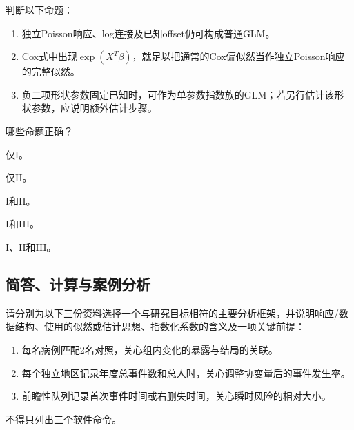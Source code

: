 \par\noindent\begin{minipage}{\linewidth}
判断以下命题：
\begin{enumerate}[label=\Roman*.]
\item 独立Poisson响应、log连接及已知offset仍可构成普通GLM。
\item Cox式中出现$\exp(X^T\beta)$，就足以把通常的Cox偏似然当作独立Poisson响应的完整似然。
\item 负二项形状参数固定已知时，可作为单参数指数族的GLM；若另行估计该形状参数，应说明额外估计步骤。
\end{enumerate}
哪些命题正确？
\begin{choices}
\item 仅I。
\item 仅II。
\item I和II。
\item I和III。
\item I、II和III。
\end{choices}
\end{minipage}\par\medskip

\subsection{简答、计算与案例分析}

请分别为以下三份资料选择一个与研究目标相符的主要分析框架，并说明响应/数据结构、使用的似然或估计思想、指数化系数的含义及一项关键前提：
\begin{enumerate}
\item 每名病例匹配2名对照，关心组内变化的暴露与结局的关联。
\item 每个独立地区记录年度总事件数和总人时，关心调整协变量后的事件发生率。
\item 前瞻性队列记录首次事件时间或右删失时间，关心瞬时风险的相对大小。
\end{enumerate}
不得只列出三个软件命令。

